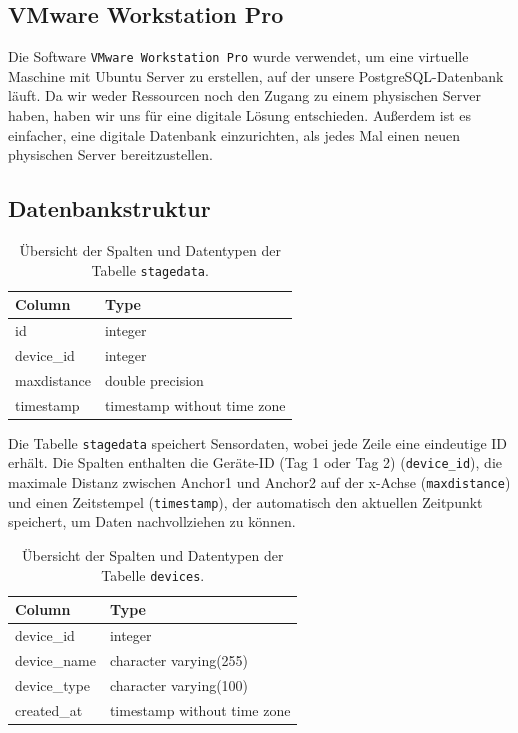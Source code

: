\subsection{VMware Workstation Pro}
Die Software \texttt{VMware Workstation Pro} wurde verwendet, um eine virtuelle Maschine mit Ubuntu Server zu erstellen, auf der unsere PostgreSQL-Datenbank läuft. Da wir weder Ressourcen noch den Zugang zu einem physischen Server haben, haben wir uns für eine digitale Lösung entschieden. Außerdem ist es einfacher, eine digitale Datenbank einzurichten, als jedes Mal einen neuen physischen Server bereitzustellen.

\subsection{Datenbankstruktur}
\begin{table}[h]
	\centering
	\begin{tabular}{|l|l|}
		\hline
		\textbf{Column} & \textbf{Type} \\
		\hline
		id & integer \\
		\hline
		device\_id & integer \\
		\hline
		maxdistance & double precision \\
		\hline
		timestamp & timestamp without time zone \\
		\hline
	\end{tabular}
	\caption{Übersicht der Spalten und Datentypen der Tabelle \texttt{stagedata}.}
	\label{tab:stagedata}
\end{table}

Die Tabelle \texttt{stagedata} speichert Sensordaten, wobei jede Zeile eine eindeutige ID erhält. Die Spalten enthalten die Geräte-ID (Tag 1 oder Tag 2) (\texttt{device\_id}), die maximale Distanz zwischen Anchor1 und Anchor2 auf der x-Achse (\texttt{maxdistance}) und einen Zeitstempel (\texttt{timestamp}), der automatisch den aktuellen Zeitpunkt speichert, um Daten nachvollziehen zu können.


\begin{table}[h]
	\centering
	\begin{tabular}{|l|l|}
		\hline
		\textbf{Column} & \textbf{Type} \\
		\hline
		device\_id & integer \\
		\hline
		device\_name & character varying(255) \\
		\hline
		device\_type & character varying(100) \\
		\hline
		created\_at & timestamp without time zone \\
		\hline
	\end{tabular}
	\caption{Übersicht der Spalten und Datentypen der Tabelle \texttt{devices}.}
	\label{tab:devices}
\end{table}

